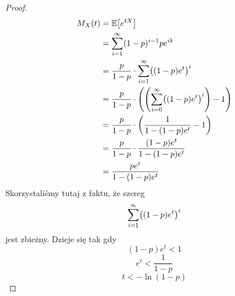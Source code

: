 \begin{proof}
	\begin{align*}
		M_X(t)
		 & = \expected{e^{tX}}                                                         \\
		 & = \sum_{i=1}^\infty (1-p)^{i-1}pe^{ik}                                      \\
		 & = \frac{p}{1 - p} \cdot \sum_{i=1}^\infty \pars{(1-p)e^t}^i                 \\
		 & = \frac{p}{1-p} \cdot \pars{\pars{\sum_{i=0}^\infty \pars{(1-p)e^t}^i} - 1} \\
		 & = \frac{p}{1-p} \cdot \pars{\frac{1}{1 - (1-p)e^t} - 1}                     \\
		 & = \frac{p}{1-p} \cdot \frac{(1-p)e^t}{1 - (1-p)e^t}                         \\
		 & = \frac{pe^t}{1 - (1-p)e^t}
	\end{align*}
	Skorzystaliśmy tutaj z faktu, że szereg \[ \sum_{i=1}^\infty \pars{(1-p)e^t}^i \]
	jest zbieżny. Dzieje się tak gdy
	\[
		(1-p)e^t < 1
	\]
	\[
		e^t < \frac{1}{1-p}
	\]
	\[
		t < -\ln (1-p)
	\]
\end{proof}